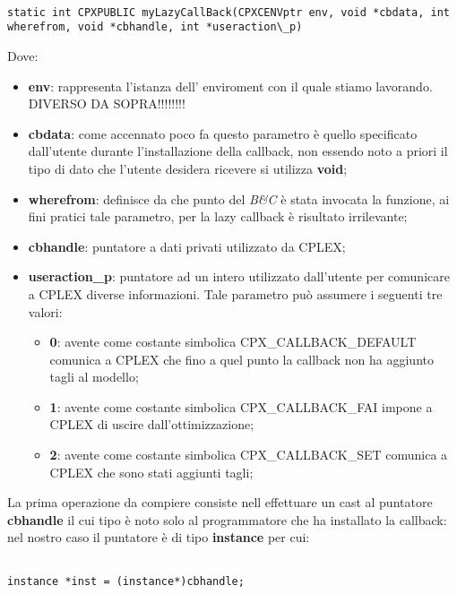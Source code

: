 \documentclass[11pt]{article}
\begin{document}
\begin{lstlisting}

static int CPXPUBLIC myLazyCallBack(CPXCENVptr env, void *cbdata, int wherefrom, void *cbhandle, int *useraction\_p)

\end{lstlisting}

Dove:

\begin{itemize}
    \item \textbf{env}: rappresenta l’istanza dell’ enviroment con il quale stiamo lavorando. DIVERSO DA SOPRA!!!!!!!!
    \item \textbf{cbdata}: come accennato poco fa questo parametro è quello specificato dall'utente durante l'installazione della callback, non essendo noto a priori il tipo di dato che l'utente desidera ricevere si utilizza \textbf{void};
    \item \textbf{wherefrom}: definisce da che punto del \textit{B\&C} è stata invocata la funzione, ai fini pratici tale parametro, per la lazy callback è risultato irrilevante;
    \item \textbf{cbhandle}: puntatore a dati privati utilizzato da CPLEX;
    \item \textbf{useraction\_p}: puntatore ad un intero utilizzato dall'utente per comunicare a CPLEX diverse informazioni. Tale parametro può assumere i seguenti tre valori:
    \begin{itemize}
    \item \textbf{0}: avente come costante simbolica CPX\_CALLBACK\_DEFAULT comunica a CPLEX che fino a quel punto la callback non ha aggiunto tagli al modello;
    \item \textbf{1}: avente come costante simbolica CPX\_CALLBACK\_FAI impone a CPLEX di uscire dall'ottimizzazione;
    \item \textbf{2}: avente come costante simbolica CPX\_CALLBACK\_SET comunica a CPLEX che sono stati aggiunti tagli;
    \end{itemize}

\end{itemize}

La prima operazione da compiere consiste nell effettuare un cast al puntatore \textbf{cbhandle} il cui tipo è noto solo al programmatore che ha installato la callback: nel nostro caso il puntatore è di tipo \textbf{instance} per cui:


\begin{lstlisting}

instance *inst = (instance*)cbhandle;

\end{lstlisting}
\end{document}
